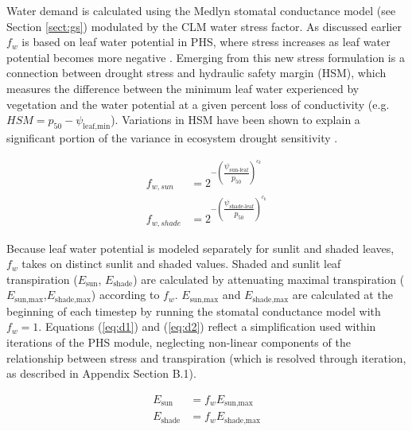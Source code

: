 \documentclass[draft,linenumbers]{agujournal}
\begin{document}
    Water demand is calculated using the Medlyn stomatal conductance model (see Section \ref{sect:gs}) modulated by the CLM water stress factor.
    As discussed earlier $f_w$ is based on leaf water potential in PHS, where stress increases as leaf water potential becomes more negative \citep{klein2014}.
Emerging from this new stress formulation is a connection between drought stress and hydraulic safety margin (HSM), which measures the difference between the minimum leaf water experienced by vegetation and the water potential at a given percent loss of conductivity (e.g. $HSM=p_{50}-\psi_{\text{leaf,min}}$). Variations in HSM have been shown to explain a significant portion of the variance in ecosystem drought sensitivity \citep{anderegg2018}.

    
     \begin{linenomath*}
     \begin{equation}
     \begin{aligned}
     \label{eq:d1}
     f_{w,sun} &= 2^{-\left(\dfrac{\psi_{\text{sun-leaf}}}{p_{50}}\right)^{c_k}} \\
     f_{w,shade} &= 2^{-\left(\dfrac{\psi_{\text{shade-leaf}}}{p_{50}}\right)^{c_k}}
     \end{aligned}     
     \end{equation}
     \end{linenomath*}
     
     Because leaf water potential is modeled separately for sunlit and shaded leaves, $f_w$ takes on distinct sunlit and shaded values.
     Shaded and sunlit leaf transpiration ($E_{\text{sun}}$, $E_{\text{shade}}$) are calculated by attenuating maximal transpiration ($E_{\text{sun,max}}$,$E_{\text{shade,max}}$) according to $f_w$. 
     $E_{\text{sun,max}}$ and $E_{\text{shade,max}}$ are calculated at the beginning of each timestep by running the stomatal conductance model with $f_w=1$.
     Equations (\ref{eq:d1}) and (\ref{eq:d2}) reflect a simplification used within iterations of the PHS module, 
     neglecting non-linear components of the relationship between stress and transpiration (which is resolved through iteration, as described in Appendix Section B.1).
     
     \begin{linenomath*}
     \begin{equation}
     \begin{aligned}
     \label{eq:d2}
     E_{\text{sun}} & = f_wE_{\text{sun,max}} \\
     E_{\text{shade}} & = f_wE_{\text{shade,max}}
     \end{aligned}     
     \end{equation}
     \end{linenomath*}
     
\end{document}
